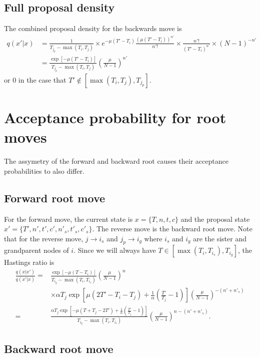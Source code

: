 \documentclass[a4paper,11pt]{article}
\begin{document}
\subsection{Full proposal density}

The combined proposal density for the backwards move is
\begin{align}
  q(x'|x) &= \frac{1}{T_{j_p}-\max(T_i,T_j)}
\times e^{-\mu(T'-T_i)}\frac{(\mu(T'-T_i))^{n'}}{n'!}
\times \frac{n'!}{(T'-T_i)^{n'}}
\times (N-1)^{-n'}\nonumber\\
&=\frac{\exp[-\mu(T'-T_i)]}{T_{j_p}-\max(T_i,T_j)}\left(\frac{\mu}{N-1}\right)^{n'}
\end{align}
or 0 in the case that $T'\notin [\max(T_i,T_j),T_{j_p}]$.

\section{Acceptance probability for root moves}

The assymetry of the forward and backward root causes their acceptance
probabilities to also differ.

\subsection{Forward root move}

For the forward move, the current state is $x=\{T,n,t,c\}$ and the
proposal state $x'=\{T',n',t',c',n'_s,t'_s,c'_s\}$. The reverse move
is the backward root move. Note that for the reverse move,
$j\rightarrow i_s$ and $j_p\rightarrow i_g$ where $i_s$ and $i_g$ are
the sister and grandparent nodes of $i$. Since we will always have
$T\in[\max(T_i,T_{i_s}),T_{i_g}]$, the Hastings ratio is
\begin{align}
  \frac{q(x|x')}{q(x'|x)}
=& \frac{\exp[-\mu(T-T_i)]}{T_{i_g}-\max(T_i,T_{i_s})}\left(\frac{\mu}{N-1}\right)^n\\
&\times
\alpha T_j\exp\left[\mu(2T'-T_i-T_j)+\frac{1}{\alpha}\left(\frac{T'}{T_j}-1\right)\right]\left(\frac{\mu}{N-1}\right)^{-(n'+n'_s)}\nonumber\\
=& \frac{\alpha T_j\exp\left[-\mu(T+T_j-2T')+\frac{1}{\alpha}\left(\frac{T'}{T_j}-1\right)\right]}{T_{i_g}-\max(T_i,T_{i_s})}\left(\frac{\mu}{N-1}\right)^{n-(n'+n'_s)}.\nonumber
\end{align}

\subsection{Backward root move}
\end{document}
